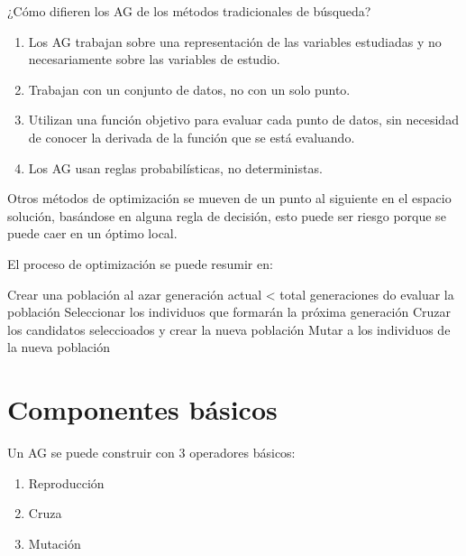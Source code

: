 
¿Cómo difieren los AG de los métodos tradicionales de búsqueda?
%
\begin{enumerate}
  \item Los AG trabajan sobre una representación de las variables estudiadas y
      no necesariamente sobre las variables de estudio.
    \item Trabajan con un conjunto de datos, no con un solo punto.
    \item Utilizan una función objetivo para evaluar cada punto de datos, sin
        necesidad de conocer la derivada de la función que se está evaluando.
    \item Los AG usan reglas probabilísticas, no deterministas.
\end{enumerate}


Otros métodos de optimización se mueven de un punto al siguiente en el espacio
solución, basándose en alguna regla de decisión, esto puede ser riesgo porque
se puede caer en un óptimo local.

El proceso de optimización se puede resumir en:

Crear una población al azar
generación actual < total generaciones do
evaluar la población
Seleccionar los individuos que formarán la próxima generación
Cruzar los candidatos seleccioados y crear la nueva población
Mutar a los individuos de la nueva población


\section{Componentes básicos}
%
Un AG se puede construir con 3 operadores básicos:
\begin{enumerate}
    \item Reproducción
    \item Cruza
    \item Mutación
\end{enumerate}

